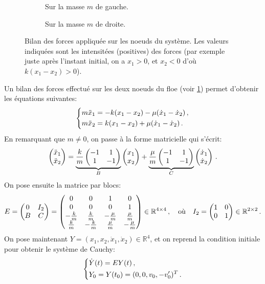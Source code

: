 \begin{figure}[!h]
    \begin{subfigure}[b]{0.33\textwidth}
        \centering
        \caption{Sur la masse $m$ de gauche.}
    \end{subfigure}
    \begin{subfigure}[b]{0.3\textwidth}
        \centering
        \caption{Sur la masse $m$ de droite.}
    \end{subfigure}
       \caption{Bilan des forces appliquée sur les noeuds du système. Les valeurs indiquées sont les intensitées (positives) des forces (par exemple juste après l'instant initial, on a $x_1 > 0$, et $x_2 < 0$ d'où $k(x_1-x_2) > 0$).}
       \label{fig:bilan0}
\end{figure}


\noindent Un bilan des forces effectué sur les deux noeuds du floe (voir \cref{fig:bilan0}) permet d'obtenir les équations suivantes:
\begin{align}
    \begin{dcases}
    m\ddot x_1 = - k(x_1 - x_2) - \mu(\dot x_1 - \dot x_2) \,,\\
        m \ddot x_2 =  k(x_1 - x_2) + \mu(\dot x_1 - \dot x_2) \,. 
    \end{dcases}
\end{align}
En remarquant que $m\neq 0$, on passe à la forme matricielle qui s'écrit:
\begin{align}
    \begin{pmatrix} \ddot{x}_1 \\ \ddot{x}_2 \end{pmatrix} = 
      \underbrace{ \frac{k}{m} \begin{pmatrix} -1 & 1 \\ 1 & -1 \end{pmatrix}}_{B} \begin{pmatrix} x_1 \\ x_2 \end{pmatrix}
    + \underbrace{\frac{\mu}{m} \begin{pmatrix} -1 & 1 \\ 1 & -1 \end{pmatrix}}_{C} \begin{pmatrix} \dot{x}_1 \\ \dot{x}_2 \end{pmatrix} \,.
\end{align}
On pose ensuite la matrice par blocs:
\[ E = \begin{pmatrix} 0 & I_2 \\ B & C \end{pmatrix}  =  \begin{pmatrix}
    0 & 0 & 1 & 0 \\ 0 & 0& 0& 1 \\ -\frac{k}{m} & \frac{k}{m} & -\frac{\mu}{m} & \frac{\mu}{m} \\ \frac{k}{m} & -\frac{k}{m} & \frac{\mu}{m} & -\frac{\mu}{m}
\end{pmatrix}   \in \mathbb{R}^{4\times 4} \,, \quad \text{où} \quad I_2 = \begin{pmatrix} 1 & 0 \\ 0 & 1 \end{pmatrix} \in \mathbb{R}^{2\times 2} \,. \]
On pose maintenant $Y = (x_1, x_2, \dot{x}_1, \dot{x}_2) \in \mathbb{R}^4$, et on reprend la condition initiale pour obtenir le système de Cauchy:
\begin{align} \label{eq:dep1d}
    \begin{dcases}
        \dot{Y}(t)= E Y(t) \,, \\
        Y_0 = Y(t_0) = (0,0,v_0,-v'_0)^T \,.
    \end{dcases}
\end{align}

